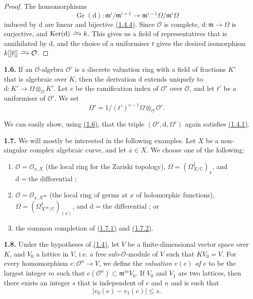\documentclass{report}
\newenvironment{rmenv}[1]
  {\phantomsection\par\medskip\noindent\textbf{#1.}\rmfamily}
  {\medskip}
\renewcommand{\cal}[1]{{\mathcal{#1}}}
\newcommand{\fk}[1]{{\mathfrak{#1}}}
\newcommand{\CC}{\mathbb{C}}
\newcommand{\dd}{\mathrm{d}}
\newcommand{\an}{\mathrm{an}}
\newcommand{\simto}{\xrightarrow{\raisebox{-0.7ex}[0ex][0ex]{$\sim$}}}
\renewcommand{\leq}{\leqslant}
\DeclareMathOperator{\Ker}{Ker}
\DeclareMathOperator{\Gr}{Gr}
\newcommand{\oldpage}[1]{\marginpar{\footnotesize$\Big\vert$ \textit{p.~#1}}}
\begin{document}
\begin{proof}
  The homomorphisms
  \[
    \Gr(\dd)\colon \fk{m}^i/\fk{m}^{i+1} \to \fk{m}^{i-1}\Omega/\fk{m}^i\Omega
  \]
  induced by $\dd$ are linear and bijective \hyperref[II.1.4.4]{(1.4.4)}.
  Since $\cal{O}$ is complete, $\dd\colon\fk{m}\to\Omega$ is surjective, and $\Ker(\dd)\simto k$.
  This gives us a field of representatives that is annihilated by $\dd$, and the choice of a uniformiser $t$ gives the desired isomorphism $k[[t]]\simto\cal{O}$.
\end{proof}

\begin{rmenv}{1.6}
\label{II.1.6}
  If an $\cal{O}$-algebra $\cal{O}'$ is a discrete valuation ring with a field of fractions $K'$ that is algebraic over $K$, then the derivation $\dd$ extends uniquely to $\dd\colon K'\to\Omega\otimes_{\cal{O}}K'$.
  Let $e$ be the ramification index of $\cal{O}'$ over $\cal{O}$, and let $t'$ be a uniformiser of $\cal{O}'$.
  We set
  \[
    \Omega' = 1/(t')^{e-1}\Omega\otimes_{\cal{O}}\cal{O}'.
  \]
\end{rmenv}

We can easily show, using \hyperref[II.1.6]{(1.6)}, that the triple $(\cal{O}',\dd,\Omega')$ again satisfies \hyperref[II.1.4.1]{(1.4.1)}.

\begin{rmenv}{1.7}
  We will mostly be interested in the following examples.
  Let $X$ be a non-singular complex algebraic curve, and let $x\in X$.
  We choose one of the following:
  \begin{enumerate}
    \item[(1.7.1)]\label{II.1.7.1}
      $\cal{O}=\cal{O}_{x,X}$ (the local ring for the Zariski topology), $\Omega=(\Omega_{X/\CC}^1)_x$, and $\dd=\mbox{the differential}$ ;
    \item[(1.7.2)]\label{II.1.7.2}
      $\cal{O}=\cal{O}_{x,X^\an}$ (the local ring of germs at $x$ of holomorphic functions), $\Omega=(\Omega_{X^\an/\CC}^1)_{(x)}$, and $\dd=\mbox{the differential}$ ; or
    \item[(1.7.3)]\label{II.1.7.3}
      the common completion of \hyperref[II.1.7.1]{(1.7.1)} and \hyperref[II.1.7.2]{(1.7.2)}.
  \end{enumerate}
\end{rmenv}

\oldpage{45}
\begin{rmenv}{1.8}
\label{II.1.8}
  Under the hypotheses of \hyperref[II.1.4]{(1.4)}, let $V$ be a finite-dimensional vector space over $K$, and $V_0$ a lattice in $V$, i.e. a free sub-$\cal{O}$-module of $V$ such that $KV_0=V$.
  For every homomorphism $e\colon\cal{O}^n\to V$, we define the \emph{valuation $v(e)$ of $e$} to be the largest integer $m$ such that $e(\cal{O}^n)\subset\fk{m}^m V_0$.
  If $V_0$ and $V_1$ are two lattices, then there exists an integer $s$ that is independent of $e$ and $n$ and is such that
  \[
  \label{II.1.8.1}
    |v_0(e) - v_1(e)| \leq s.
  \tag{1.8.1}
  \]
\end{rmenv}
\end{document}
